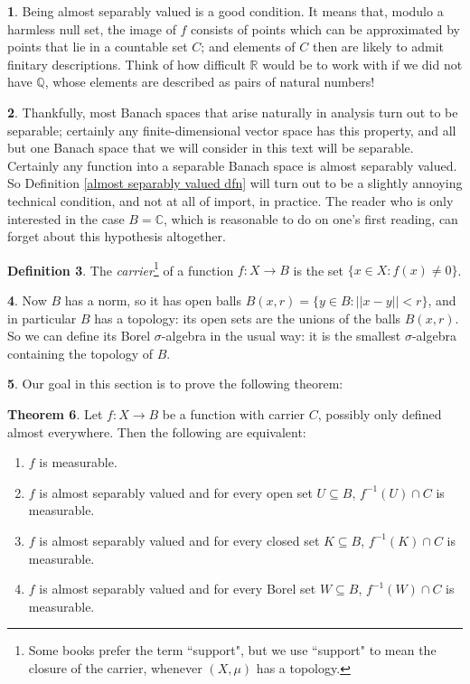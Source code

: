 \documentclass[12pt]{book}
\newcommand{\QQ}{\mathbb{Q}}
\newcommand{\RR}{\mathbb{R}}
\newcommand{\CC}{\mathbb{C}}
\newcommand{\dfn}[1]{\emph{#1}\index{#1}}
\theoremstyle{definition}
\newtheorem{theorem}{Theorem}[section]
\newtheorem{subsec}[theorem]{}
\newtheorem{definition}[theorem]{Definition}
\begin{document}
\begin{subsec}
Being almost separably valued is a good condition. It means that, modulo a harmless null set, the image of $f$ consists of points which can be approximated by points that lie in a countable set $C$; and elements of $C$ then are likely to admit finitary descriptions.
Think of how difficult $\RR$ would be to work with if we did not have $\QQ$, whose elements are described as pairs of natural numbers!
\end{subsec}

\begin{subsec}
Thankfully, most Banach spaces that arise naturally in analysis turn out to be separable; certainly any finite-dimensional vector space has this property, and all but one Banach space that we will consider in this text will be separable.
Certainly any function into a separable Banach space is almost separably valued. So Definition \ref{almost separably valued dfn} will turn out to be a slightly annoying technical condition, and not at all of import, in practice.
The reader who is only interested in the case $B = \CC$, which is reasonable to do on one's first reading, can forget about this hypothesis altogether.
\end{subsec}

\begin{definition}
The \dfn{carrier}\footnote{Some books prefer the term ``support", but we use ``support" to mean the closure of the carrier, whenever $(X, \mu)$ has a topology.} of a function $f: X \to B$ is the set $\{x \in X: f(x) \neq 0\}$.
\end{definition}

\begin{subsec}
Now $B$ has a norm, so it has open balls $B(x, r) = \{y \in B: ||x - y|| < r\}$, and in particular $B$ has a topology: its open sets are the unions of the balls $B(x, r)$.
So we can define its Borel $\sigma$-algebra in the usual way: it is the smallest $\sigma$-algebra containing the topology of $B$.
\end{subsec}

\begin{subsec}
Our goal in this section is to prove the following theorem:
\end{subsec}

\begin{theorem}
\label{characterization of measurable functions}
Let $f: X \to B$ be a function with carrier $C$, possibly only defined almost everywhere. Then the following are equivalent:
\begin{enumerate}
\item $f$ is measurable.
\item $f$ is almost separably valued and for every open set $U \subseteq B$, $f^{-1}(U) \cap C$ is measurable.
\item $f$ is almost separably valued and for every closed set $K \subseteq B$, $f^{-1}(K) \cap C$ is measurable.
\item $f$ is almost separably valued and for every Borel set $W \subseteq B$, $f^{-1}(W) \cap C$ is measurable.
\end{enumerate}
\end{theorem}
\end{document}
